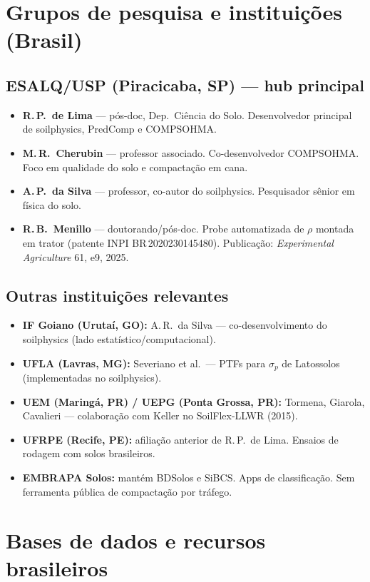 \documentclass[12pt,a4paper]{article}
\newcommand{\Section}[1]{\needspace{12\baselineskip}\section{#1}}
\newcommand{\SubsectionKeep}[1]{\needspace{10\baselineskip}\subsection{#1}}
\newenvironment{NoBreakItemize}
{\begin{samepage}\begin{itemize}}
{\end{itemize}\end{samepage}}
\begin{document}
\Section{Grupos de pesquisa e instituições (Brasil)}

\SubsectionKeep{ESALQ/USP (Piracicaba, SP) --- hub principal}
\begin{NoBreakItemize}
  \item \textbf{R.\,P.\ de Lima} --- pós-doc, Dep.\ Ciência do Solo. Desenvolvedor principal de soilphysics, PredComp e COMPSOHMA.
  \item \textbf{M.\,R.\ Cherubin} --- professor associado. Co-desenvolvedor COMPSOHMA. Foco em qualidade do solo e compactação em cana.
  \item \textbf{A.\,P.\ da Silva} --- professor, co-autor do soilphysics. Pesquisador sênior em física do solo.
  \item \textbf{R.\,B.\ Menillo} --- doutorando/pós-doc. Probe automatizada de $\rho$ montada em trator (patente INPI BR\,2020230145480). Publicação: \textit{Experimental Agriculture} 61, e9, 2025.
\end{NoBreakItemize}

\SubsectionKeep{Outras instituições relevantes}
\begin{NoBreakItemize}
  \item \textbf{IF Goiano (Urutaí, GO):} A.\,R.\ da Silva --- co-desenvolvimento do soilphysics (lado estatístico/computacional).
  \item \textbf{UFLA (Lavras, MG):} Severiano et al.\ --- PTFs para $\sigma_p$ de Latossolos (implementadas no soilphysics).
  \item \textbf{UEM (Maringá, PR) / UEPG (Ponta Grossa, PR):} Tormena, Giarola, Cavalieri --- colaboração com Keller no SoilFlex-LLWR (2015).
  \item \textbf{UFRPE (Recife, PE):} afiliação anterior de R.\,P.\ de Lima. Ensaios de rodagem com solos brasileiros.
  \item \textbf{EMBRAPA Solos:} mantém BDSolos e SiBCS. Apps de classificação. Sem ferramenta pública de compactação por tráfego.
\end{NoBreakItemize}

\Section{Bases de dados e recursos brasileiros}
\end{document}
